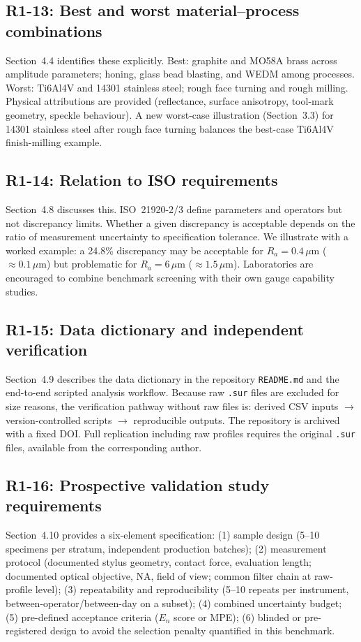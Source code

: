 \documentclass[10pt]{article}
\begin{document}
\subsection*{R1-13: Best and worst material--process combinations}
Section~4.4 identifies these explicitly. Best: graphite and MO58A brass across amplitude parameters; honing, glass bead blasting, and WEDM among processes. Worst: Ti6Al4V and 14301 stainless steel; rough face turning and rough milling. Physical attributions are provided (reflectance, surface anisotropy, tool-mark geometry, speckle behaviour). A new worst-case illustration (Section~3.3) for 14301 stainless steel after rough face turning balances the best-case Ti6Al4V finish-milling example.

\subsection*{R1-14: Relation to ISO requirements}
Section~4.8 discusses this. ISO~21920-2/3 define parameters and operators but not discrepancy limits. Whether a given discrepancy is acceptable depends on the ratio of measurement uncertainty to specification tolerance. We illustrate with a worked example: a 24.8\% discrepancy may be acceptable for $R_a = 0.4\,\mu$m ($\approx 0.1\,\mu$m) but problematic for $R_a = 6\,\mu$m ($\approx 1.5\,\mu$m). Laboratories are encouraged to combine benchmark screening with their own gauge capability studies.

\subsection*{R1-15: Data dictionary and independent verification}
Section~4.9 describes the data dictionary in the repository \texttt{README.md} and the end-to-end scripted analysis workflow. Because raw \texttt{.sur} files are excluded for size reasons, the verification pathway without raw files is: derived CSV inputs $\rightarrow$ version-controlled scripts $\rightarrow$ reproducible outputs. The repository is archived with a fixed DOI. Full replication including raw profiles requires the original \texttt{.sur} files, available from the corresponding author.

\subsection*{R1-16: Prospective validation study requirements}
Section~4.10 provides a six-element specification: (1) sample design (5--10 specimens per stratum, independent production batches); (2) measurement protocol (documented stylus geometry, contact force, evaluation length; documented optical objective, NA, field of view; common filter chain at raw-profile level); (3) repeatability and reproducibility (5--10 repeats per instrument, between-operator/between-day on a subset); (4) combined uncertainty budget; (5) pre-defined acceptance criteria ($E_n$ score or MPE); (6) blinded or pre-registered design to avoid the selection penalty quantified in this benchmark.
\end{document}
